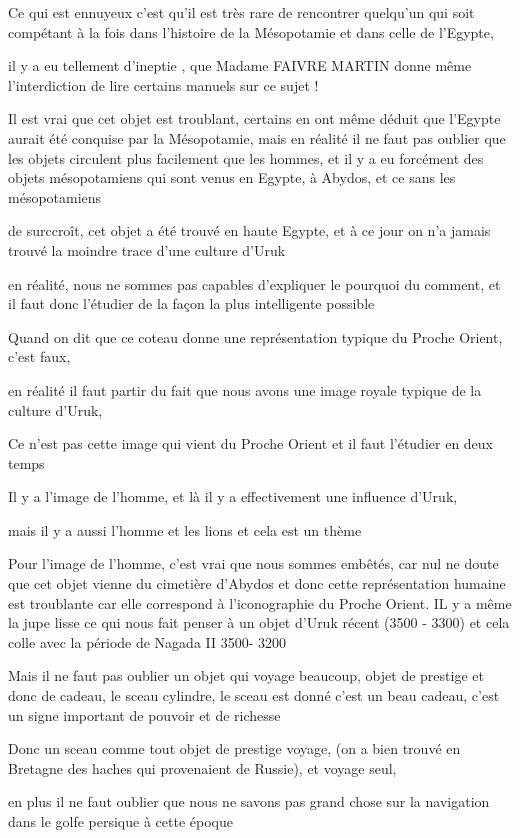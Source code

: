 \documentclass[a4paper,10pt]{article}
\begin{document}
\begin{itemize}
Ce qui est ennuyeux c'est qu'il est
très rare de rencontrer quelqu'un qui soit compétant à
la fois dans l'histoire de la Mésopotamie et dans
celle de l'Egypte, 

il y a eu tellement d'ineptie , que Madame FAIVRE
MARTIN donne même l'interdiction de lire certains
manuels sur ce sujet !

Il est vrai que cet objet est troublant, certains en ont même déduit que
l'Egypte aurait été conquise par la Mésopotamie, mais
en réalité il ne faut pas oublier que les objets circulent plus
facilement que les hommes, et il y a eu forcément des objets
mésopotamiens qui sont venus en Egypte, à Abydos, et ce sans les
mésopotamiens

de surccroît, cet objet a été trouvé en haute Egypte, et à ce jour on
n'a jamais trouvé la moindre trace
d'une culture d'Uruk

en réalité, nous ne sommes pas capables d'expliquer le
pourquoi du comment, et il faut donc l'étudier de la
façon la plus intelligente possible

Quand on dit que ce coteau donne une représentation typique du Proche
Orient, c'est faux, 

en réalité il faut partir du fait que nous avons une image royale
typique de la culture d'Uruk, 

Ce n'est pas cette image qui vient du Proche Orient et
il faut l'étudier en deux temps

Il y a l'image de l'homme, et là il y
a effectivement une influence d'Uruk, 

mais il y a aussi l'homme et les lions et cela est un
thème

Pour l'image de l'homme,
c'est vrai que nous sommes embêtés, car nul ne doute
que cet objet vienne du cimetière d'Abydos et donc
cette représentation humaine est troublante car elle correspond à
l'iconographie du Proche Orient. IL y a même la jupe
lisse ce qui nous fait penser à un objet d'Uruk récent
(3500 - 3300) et cela colle avec la période de Nagada II 3500- 3200

Mais il ne faut pas oublier un objet qui voyage beaucoup, objet de
prestige et donc de cadeau, le sceau cylindre, le sceau est donné
c'est un beau cadeau, c'est un signe
important de pouvoir et de richesse

Donc un sceau comme tout objet de prestige voyage, (on a bien trouvé en
Bretagne des haches qui provenaient de Russie), et voyage seul, 

en plus il ne faut oublier que nous ne savons pas grand chose sur la
navigation dans le golfe persique à cette époque


\end{itemize}
\end{document}
